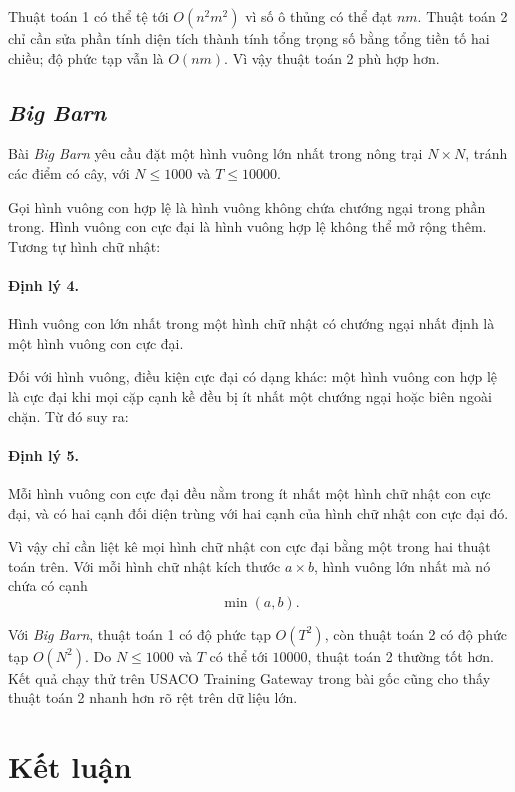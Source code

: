 \documentclass[11pt]{article}
\begin{document}
Thuật toán 1 có thể tệ tới \(O(n^2m^2)\) vì số ô thủng có thể đạt \(nm\).
Thuật toán 2 chỉ cần sửa phần tính diện tích thành tính tổng trọng số bằng
tổng tiền tố hai chiều; độ phức tạp vẫn là \(O(nm)\). Vì vậy thuật toán 2 phù
hợp hơn.

\subsection{\textit{Big Barn}}

Bài \textit{Big Barn} yêu cầu đặt một hình vuông lớn nhất trong nông trại
\(N\times N\), tránh các điểm có cây, với \(N\le 1000\) và \(T\le 10000\).

Gọi hình vuông con hợp lệ là hình vuông không chứa chướng ngại trong phần
trong. Hình vuông con cực đại là hình vuông hợp lệ không thể mở rộng thêm.
Tương tự hình chữ nhật:

\paragraph{Định lý 4.}
Hình vuông con lớn nhất trong một hình chữ nhật có chướng ngại nhất định là
một hình vuông con cực đại.

Đối với hình vuông, điều kiện cực đại có dạng khác: một hình vuông con hợp lệ
là cực đại khi mọi cặp cạnh kề đều bị ít nhất một chướng ngại hoặc biên ngoài
chặn. Từ đó suy ra:

\paragraph{Định lý 5.}
Mỗi hình vuông con cực đại đều nằm trong ít nhất một hình chữ nhật con cực
đại, và có hai cạnh đối diện trùng với hai cạnh của hình chữ nhật con cực đại
đó.

Vì vậy chỉ cần liệt kê mọi hình chữ nhật con cực đại bằng một trong hai thuật
toán trên. Với mỗi hình chữ nhật kích thước \(a\times b\), hình vuông lớn
nhất mà nó chứa có cạnh
\[
  \min(a,b).
\]

Với \textit{Big Barn}, thuật toán 1 có độ phức tạp \(O(T^2)\), còn thuật toán
2 có độ phức tạp \(O(N^2)\). Do \(N\le 1000\) và \(T\) có thể tới \(10000\),
thuật toán 2 thường tốt hơn. Kết quả chạy thử trên USACO Training Gateway
trong bài gốc cũng cho thấy thuật toán 2 nhanh hơn rõ rệt trên dữ liệu lớn.

\section{Kết luận}
\end{document}
